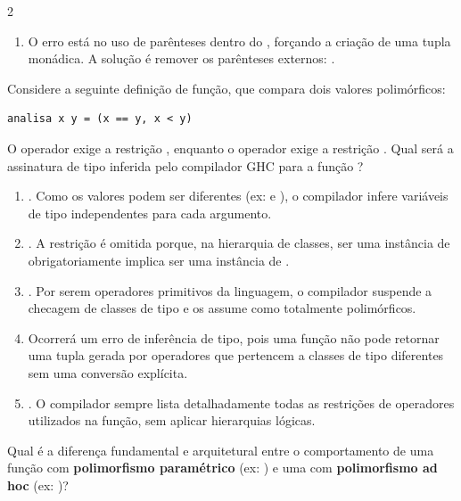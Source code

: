 \documentclass[a4paper,10pt,brazil]{article}
\begin{document}
\begin{multicols}{2}
\begin{enumerate}
  \item O erro está no uso de parênteses dentro do , forçando a criação de uma tupla monádica. A solução é remover os parênteses externos: .


\end{enumerate}

Considere a seguinte definição de função, que compara dois valores polimórficos:
\begin{verbatim}
analisa x y = (x == y, x < y)
\end{verbatim}
O operador \haskellinline{==} exige a restrição , enquanto o operador \haskellinline{<} exige a restrição . Qual será a assinatura de tipo inferida pelo compilador GHC para a função ?

\begin{enumerate}
  \item {}. Como os valores podem ser diferentes (ex:  e ), o compilador infere variáveis de tipo independentes para cada argumento.

  \item {}. A restrição  é omitida porque, na hierarquia de classes, ser uma instância de  obrigatoriamente implica ser uma instância de .

  \item {}. Por serem operadores primitivos da linguagem, o compilador suspende a checagem de classes de tipo e os assume como totalmente polimórficos.

  \item Ocorrerá um erro de inferência de tipo, pois uma função não pode retornar uma tupla gerada por operadores que pertencem a classes de tipo diferentes sem uma conversão explícita.

  \item {}. O compilador sempre lista detalhadamente todas as restrições de operadores utilizados na função, sem aplicar hierarquias lógicas.


\end{enumerate}

Qual é a diferença fundamental e arquitetural entre o comportamento de uma função com \textbf{polimorfismo paramétrico} (ex: ) e uma com \textbf{polimorfismo ad hoc} (ex: )?


\end{multicols}
\end{document}
